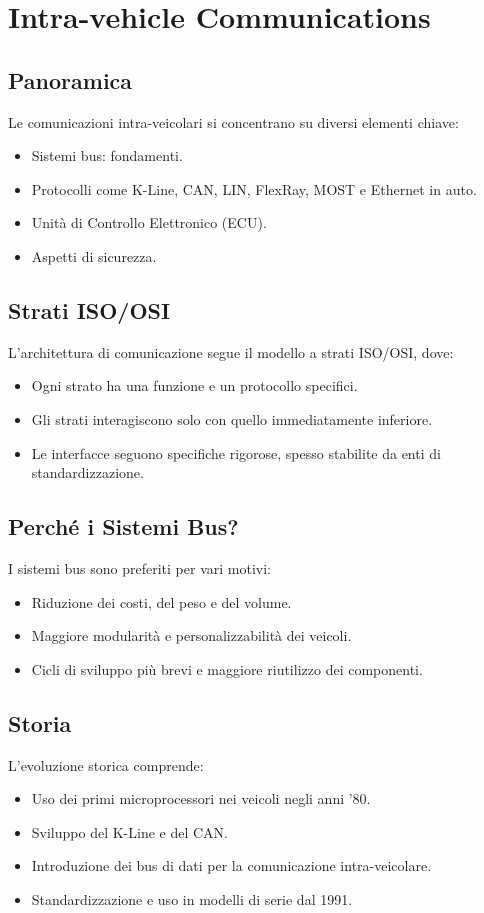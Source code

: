 \section{Intra-vehicle Communications}

\subsection{Panoramica}
Le comunicazioni intra-veicolari si concentrano su diversi elementi chiave:
\begin{itemize}
    \item Sistemi bus: fondamenti.
    \item Protocolli come K-Line, CAN, LIN, FlexRay, MOST e Ethernet in auto.
    \item Unità di Controllo Elettronico (ECU).
    \item Aspetti di sicurezza.
\end{itemize}

\subsection{Strati ISO/OSI}
L'architettura di comunicazione segue il modello a strati ISO/OSI, dove:
\begin{itemize}
    \item Ogni strato ha una funzione e un protocollo specifici.
    \item Gli strati interagiscono solo con quello immediatamente inferiore.
    \item Le interfacce seguono specifiche rigorose, spesso stabilite da enti di standardizzazione.
\end{itemize}

\subsection{Perché i Sistemi Bus?}
I sistemi bus sono preferiti per vari motivi:
\begin{itemize}
    \item Riduzione dei costi, del peso e del volume.
    \item Maggiore modularità e personalizzabilità dei veicoli.
    \item Cicli di sviluppo più brevi e maggiore riutilizzo dei componenti.
\end{itemize}

\subsection{Storia}
L'evoluzione storica comprende:
\begin{itemize}
    \item Uso dei primi microprocessori nei veicoli negli anni '80.
    \item Sviluppo del K-Line e del CAN.
    \item Introduzione dei bus di dati per la comunicazione intra-veicolare.
    \item Standardizzazione e uso in modelli di serie dal 1991.
\end{itemize}

